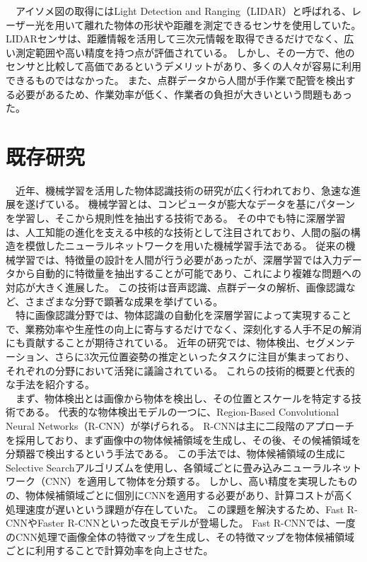 　アイソメ図の取得にはLight Detection and Ranging（LIDAR）と呼ばれる、レーザー光を用いて離れた物体の形状や距離を測定できるセンサを使用していた。
LIDARセンサは、距離情報を活用して三次元情報を取得できるだけでなく、広い測定範囲や高い精度を持つ点が評価されている。
しかし、その一方で、他のセンサと比較して高価であるというデメリットがあり、多くの人々が容易に利用できるものではなかった。
また、点群データから人間が手作業で配管を検出する必要があるため、作業効率が低く、作業者の負担が大きいという問題もあった。\\

\section{既存研究}
　近年、機械学習を活用した物体認識技術の研究が広く行われており、急速な進展を遂げている。
機械学習とは、コンピュータが膨大なデータを基にパターンを学習し、そこから規則性を抽出する技術である。
その中でも特に深層学習は、人工知能の進化を支える中核的な技術として注目されており、人間の脳の構造を模倣したニューラルネットワークを用いた機械学習手法である。
従来の機械学習では、特徴量の設計を人間が行う必要があったが、深層学習では入力データから自動的に特徴量を抽出することが可能であり、これにより複雑な問題への対応が大きく進展した。
この技術は音声認識、点群データの解析、画像認識など、さまざまな分野で顕著な成果を挙げている。\\
　特に画像認識分野では、物体認識の自動化を深層学習によって実現することで、業務効率や生産性の向上に寄与するだけでなく、深刻化する人手不足の解消にも貢献することが期待されている。
近年の研究では、物体検出、セグメンテーション、さらに3次元位置姿勢の推定といったタスクに注目が集まっており、それぞれの分野において活発に議論されている。
これらの技術的概要と代表的な手法を紹介する。\\
　まず、物体検出とは画像から物体を検出し、その位置とスケールを特定する技術である。
代表的な物体検出モデルの一つに、Region-Based Convolutional Neural Networks（R-CNN）が挙げられる。
R-CNNは主に二段階のアプローチを採用しており、まず画像中の物体候補領域を生成し、その後、その候補領域を分類器で検出するという手法である。
この手法では、物体候補領域の生成にSelective Searchアルゴリズムを使用し、各領域ごとに畳み込みニューラルネットワーク（CNN）を適用して物体を分類する。
しかし、高い精度を実現したものの、物体候補領域ごとに個別にCNNを適用する必要があり、計算コストが高く処理速度が遅いという課題が存在していた。
この課題を解決するため、Fast R-CNNやFaster R-CNNといった改良モデルが登場した。
Fast R-CNNでは、一度のCNN処理で画像全体の特徴マップを生成し、その特徴マップを物体候補領域ごとに利用することで計算効率を向上させた。
